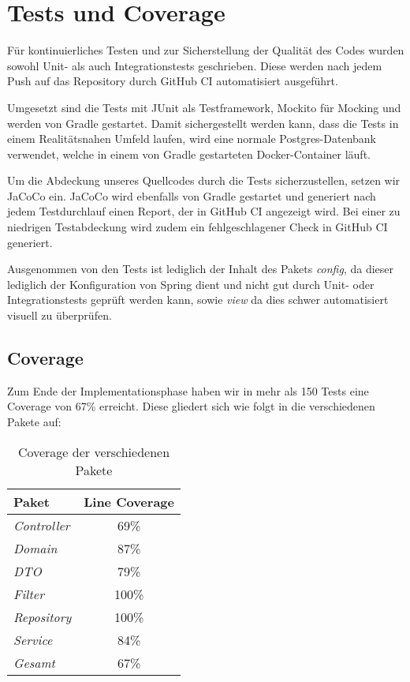 
\chapter{Tests und Coverage}
\label{ch:tests}

Für kontinuierliches Testen und zur Sicherstellung der Qualität des Codes wurden sowohl Unit- als auch Integrationstests geschrieben.
Diese werden nach jedem Push auf das Repository durch GitHub CI automatisiert ausgeführt.

Umgesetzt sind die Tests mit JUnit als Testframework, Mockito für Mocking und werden von Gradle gestartet.
Damit sichergestellt werden kann, dass die Tests in einem Realitätsnahen Umfeld laufen,
wird eine normale Postgres-Datenbank verwendet, welche in einem von Gradle gestarteten Docker-Container läuft.

Um die Abdeckung unseres Quellcodes durch die Tests sicherzustellen, setzen wir JaCoCo ein.
JaCoCo wird ebenfalls von Gradle gestartet und generiert nach jedem Testdurchlauf einen Report, der in GitHub CI angezeigt wird.
Bei einer zu niedrigen Testabdeckung wird zudem ein fehlgeschlagener Check in GitHub CI generiert.

Ausgenommen von den Tests ist lediglich der Inhalt des Pakets \textit{config},
da dieser lediglich der Konfiguration von Spring dient und nicht gut durch Unit- oder Integrationstests geprüft werden kann, sowie \textit{view} da dies schwer automatisiert visuell zu überprüfen.

\newpage

\section{Coverage}\label{sec:coverage}

Zum Ende der Implementationsphase haben wir in mehr als 150 Tests eine Coverage von 67\% erreicht.
Diese gliedert sich wie folgt in die verschiedenen Pakete auf:

\begin{table}[h]
    \centering
    \renewcommand{\arraystretch}{1.3}
    \begin{tabular}{l|c}
        \textbf{Paket} & \textbf{Line Coverage} \\
        \hline
        \hline
        \textit{Controller}  & 69\% \\
        \textit{Domain}      & 87\% \\
        \textit{DTO}         & 79\% \\
        \textit{Filter}      & 100\% \\
        \textit{Repository}  & 100\% \\
        \textit{Service}     & 84\% \\
        \hline
        \textit{Gesamt}      & 67\% \\
    \end{tabular}
    \caption{Coverage der verschiedenen Pakete}
    \label{tab:progress}
\end{table}
